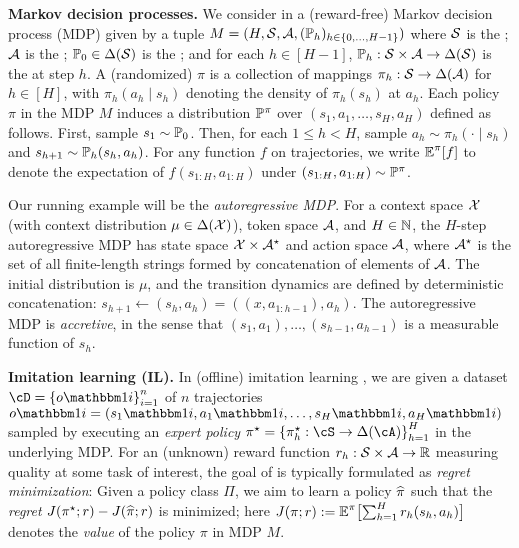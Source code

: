 \vspace{0.3em}
\noindent\textbf{Markov decision processes.} We consider \IL{}{} 
in a (reward-free) Markov decision process (MDP) given by a tuple $M = (H, \MS,\MA,
(\BP_h)_{h \in \crl{0,\ldots,H-1}})$ where $\MS$ is
the ; $\MA$ is the
; $\BP_0 \in \Delta(\MS)$ is the ; and for each $h \in [H-1]$, $\BP_h: \MS \times \MA
\to \Delta(\MS)$ is the  at step $h$.
A (randomized)  $\pi$ is a
collection of mappings $\pi_h: \MS \to \Delta(\MA)$ for $h \in [H]$,
with $\pi_h(a_h \mid{} s_h)$ denoting the density of $\pi_h(s_h)$ at
$a_h$. Each policy $\pi$ in the MDP $M$ induces a distribution
$\BP^{\pi}$ over  $(s_1,a_1,\dots,s_H,a_H)$ defined
as follows. First, sample $s_1 \sim \BP_0$. Then, for each $1 \leq h <
H$, sample $a_h \sim \pi_h(\cdot\mid{}s_h)$ and $s_{h+1} \sim
\BP_h(s_h,a_h)$. For any function $f$ on trajectories, we write
$\EE^{\pi}[f]$ to denote the expectation of $f(s_{1:H},a_{1:H})$
under $(s_{1:H},a_{1:H}) \sim \BP^{\pi}$.\loose

Our running example will be the \emph{autoregressive MDP}. For a context space $\MX$ (with context distribution $\mu\in\Delta(\MX)$), token space $\MA$, and $H \in \NN$, the $H$-step autoregressive MDP has state space $\MX\times\MA^\st$ and action space $\MA$, where $\MA^\st$ is the set of all finite-length strings formed by concatenation of elements of $\MA$. The initial distribution is $\mu$, and the transition dynamics are defined by deterministic concatenation: $s_{h+1} \gets (s_h,a_h) = ((x,a_{1:h-1}),a_h)$. The autoregressive MDP is \emph{accretive}, in the sense that $(s_1,a_1),\dots,(s_{h-1},a_{h-1})$ is a measurable function of $s_h$.

\vspace{0.3em}
\noindent\textbf{Imitation learning (IL).} In (offline) imitation learning \citep{pomerleau1988alvinn,ross2010efficient,foster2024behavior}, we are given a dataset $\cD=\crl*{o\ind{i}}_{i=1}^{n}$ of $n$
trajectories
$o\ind{i}=(s_1\ind{i},a_1\ind{i}, \ldots, s_H\ind{i},a_H\ind{i})$
sampled \iid by executing an \emph{expert policy}
$\pistar=\crl*{\pistar_h:\cS\to\Delta(\cA)}_{h=1}^{H}$ in the
underlying MDP. For an (unknown) reward function $r_h: \MS\times\MA
\to \RR$ measuring quality at some task of interest, the goal of
\IL{} is typically formulated as \emph{regret
  minimization}: Given a policy class $\Pi$,  we aim to learn a policy
$\pihat$ such that the \emph{regret} $J(\pistar;r) - J(\pihat;r)$ is
minimized; here $J(\pi;r) :=
\EE^{\pi}\brk[\big]{\sum_{h=1}^H r_h(s_h,a_h)}$ denotes the \emph{value}
of the policy $\pi$ in MDP $M$. %






